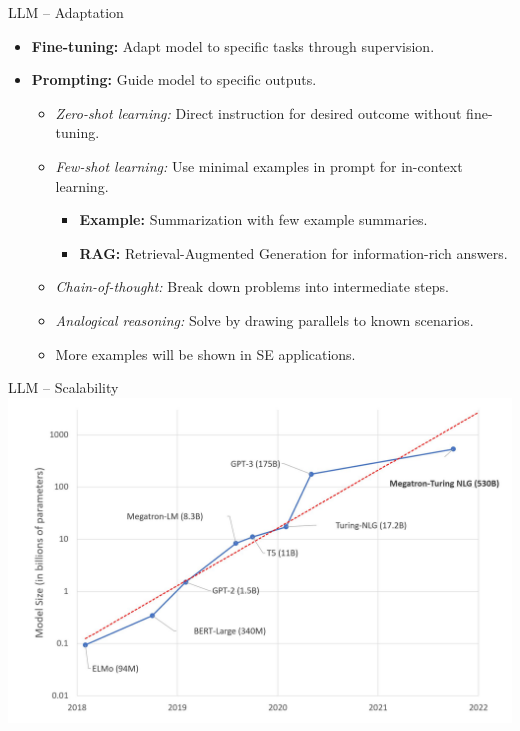 \documentclass[presentation, 10pt]{beamer}\mode<presentation>{\usetheme{AMSBolognaFC}}
\begin{document}
\begin{frame}{LLM -- Adaptation}
	\begin{itemize}
			\item \textbf{Fine-tuning:} Adapt model to specific tasks through supervision.
			
			\item \textbf{Prompting:} Guide model to specific outputs.
			\begin{itemize}
					\item \emph{Zero-shot learning:} Direct instruction for desired outcome without fine-tuning.
					\item \emph{Few-shot learning:} Use minimal examples in prompt for in-context learning.
					\begin{itemize}
							\item \textbf{Example:} Summarization with few example summaries.
							\item \textbf{RAG:} Retrieval-Augmented Generation for information-rich answers.
					\end{itemize}
					\item \emph{Chain-of-thought:} Break down problems into intermediate steps.
					\item \emph{Analogical reasoning:} Solve by drawing parallels to known scenarios.
					\item More examples will be shown in SE applications.
			\end{itemize}
	\end{itemize}
	\end{frame}
\begin{frame}{LLM -- Scalability}
	\includegraphics[width=\textwidth]{img/over-year.jpg}
\end{frame}
\end{document}
